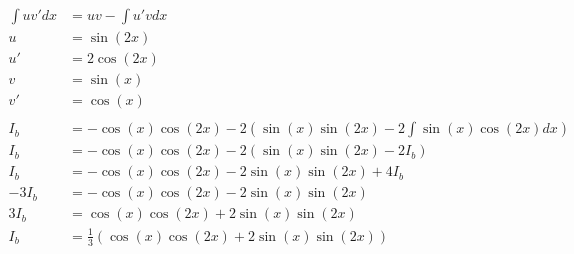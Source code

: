 \documentclass[12pt]{article}
\begin{document}
\begin{align}
    \nonumber                                                                                                                                  \\
    \int uv' dx    & = uv - \int u'v dx                                                                                                        \\
    u              & = \sin(2x)                                                                                                                \\
    u'             & = 2\cos(2x)                                                                                                               \\
    v              & = \sin(x)                                                                                                                 \\
    v'             & = \cos(x)                                                                                                                 \\
    \nonumber                                                                                                                                  \\
    I_b            & = -\cos(x)\cos(2x) - 2\left( \sin(x)\sin(2x) - 2\int \sin(x)\cos(2x) dx \right)                                           \\
    I_b            & = -\cos(x)\cos(2x) - 2( \sin(x)\sin(2x) - 2I_b)                                                                           \\
    I_b            & = -\cos(x)\cos(2x) - 2\sin(x)\sin(2x) + 4I_b                                                                              \\
    -3I_b          & = -\cos(x)\cos(2x) - 2\sin(x)\sin(2x)                                                                                     \\
    3I_b           & = \cos(x)\cos(2x) + 2\sin(x)\sin(2x)                                                                                      \\
    I_b            & = \frac{1}{3}\left(\cos(x)\cos(2x) + 2\sin(x)\sin(2x)\right)                                                              \\
    \nonumber                                                                                                                                  \\

\end{align}
\end{document}
